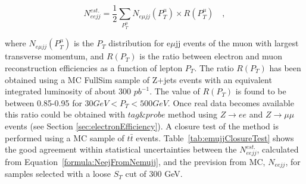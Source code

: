 \begin{equation} \label{formula:NeejFromNemujj}
N_{eejj}^{est.} = \frac{1}{2}\sum_{P_{T}^{\mu}} N_{e\mu jj}(P_{T}^{\mu}) \times R(P_{T}^{\mu}) \quad , 
\end{equation}

where $N_{e\mu jj}(P_{T}^{\mu})$ is the $P_{T}$ distribution for e$\mu$jj events of the muon  
with largest transverse momentum, and $R(P_{T})$ is the ratio between electron 
and muon reconstruction efficiencies as a function of lepton $P_{T}$. The ratio $R(P_{T})$ has been obtained 
using a MC FullSim sample of Z+jets events with an equivalent integrated luminosity of about 300 $pb^{-1}$.
The value of $R(P_{T})$ is found to be between 0.85-0.95 for $30 GeV < P_{T} < 500 GeV$.
Once real data becomes available this ratio could be obtained with $tag\&probe$ method using $Z \rightarrow ee$ and 
$Z \rightarrow \mu\mu$ events (see Section \ref{sec:electronEfficiency}).
A closure test of the method is performed using a MC sample of $t\bar{t}$ events. 
Table~\ref{tab:emujjClosureTest} shows the good agreement within statistical uncertainties between 
the $N_{eejj}^{est.}$, calculated from Equation~\ref{formula:NeejFromNemujj}, 
and the prevision from MC, $N_{eejj}$, for samples selected with a loose $S_{T}$ cut of 300 GeV.   


